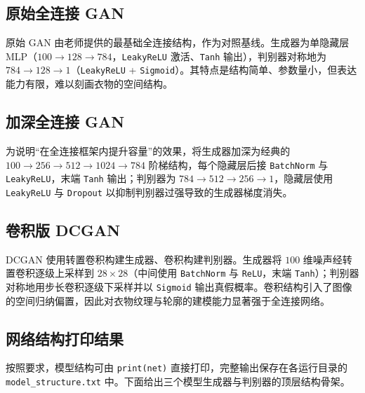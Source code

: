 \documentclass[a4paper]{article}
\begin{document}
\subsection{原始全连接 GAN}
原始 GAN 由老师提供的最基础全连接结构，作为对照基线。生成器为单隐藏层 MLP（$100\rightarrow128\rightarrow784$，\texttt{LeakyReLU} 激活、\texttt{Tanh} 输出），判别器对称地为 $784\rightarrow128\rightarrow1$（\texttt{LeakyReLU} + \texttt{Sigmoid}）。其特点是结构简单、参数量小，但表达能力有限，难以刻画衣物的空间结构。

\subsection{加深全连接 GAN}
为说明“在全连接框架内提升容量”的效果，将生成器加深为经典的 $100\rightarrow256\rightarrow512\rightarrow1024\rightarrow784$ 阶梯结构，每个隐藏层后接 \texttt{BatchNorm} 与 \texttt{LeakyReLU}\cite{ioffe2015batchnorm}，末端 \texttt{Tanh} 输出；判别器为 $784\rightarrow512\rightarrow256\rightarrow1$，隐藏层使用 \texttt{LeakyReLU} 与 \texttt{Dropout} 以抑制判别器过强导致的生成器梯度消失。

\subsection{卷积版 DCGAN}
DCGAN 使用转置卷积构建生成器、卷积构建判别器\cite{radford2015dcgan}。生成器将 $100$ 维噪声经转置卷积逐级上采样到 $28\times28$（中间使用 \texttt{BatchNorm} 与 \texttt{ReLU}，末端 \texttt{Tanh}）；判别器对称地用步长卷积逐级下采样并以 \texttt{Sigmoid} 输出真假概率。卷积结构引入了图像的空间归纳偏置，因此对衣物纹理与轮廓的建模能力显著强于全连接网络。

\subsection{网络结构打印结果}
按照要求，模型结构可由 \texttt{print(net)} 直接打印，完整输出保存在各运行目录的 \texttt{model\_structure.txt} 中。下面给出三个模型生成器与判别器的顶层结构骨架。
\end{document}
